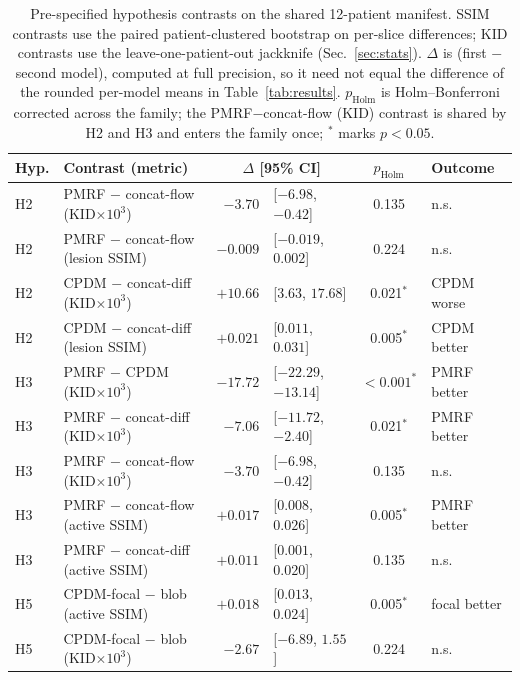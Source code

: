 \documentclass[11pt,a4paper]{article}
\newcommand{\num}[1]{#1}
\begin{document}
\begin{table}[h]\centering\footnotesize
\setlength{\tabcolsep}{5pt}
\caption[Pre-specified hypothesis contrasts on the shared 12-patient manifest]{Pre-specified
hypothesis contrasts on the shared \num{12}-patient manifest. SSIM contrasts use the paired
patient-clustered bootstrap on per-slice differences; KID contrasts use the leave-one-patient-out
jackknife (Sec.~\ref{sec:stats}). $\Delta$ is (first $-$ second model), computed at full
precision, so it need not equal the difference of the rounded per-model means in
Table~\ref{tab:results}. $p_{\text{Holm}}$ is Holm--Bonferroni corrected across the family; the
PMRF$-$concat-flow (KID) contrast is shared by H2 and H3 and enters the family once; $^*$ marks
$p<0.05$.}
\label{tab:hyptests}
\begin{tabular}{@{}l l r@{ }l c l@{}}
\toprule
Hyp. & Contrast (metric) & \multicolumn{2}{c}{$\Delta$ [95\% CI]} & $p_{\text{Holm}}$ & Outcome \\
\midrule
H2 & PMRF $-$ concat-flow (KID$\times10^3$)   & $-3.70$  & [$-6.98$, $-0.42$]    & \num{0.135}     & n.s. \\
H2 & PMRF $-$ concat-flow (lesion SSIM)       & $-0.009$ & [$-0.019$, $0.002$]   & \num{0.224}     & n.s. \\
H2 & CPDM $-$ concat-diff (KID$\times10^3$)   & $+10.66$ & [$3.63$, $17.68$]     & \num{0.021}$^*$ & CPDM worse \\
H2 & CPDM $-$ concat-diff (lesion SSIM)       & $+0.021$ & [$0.011$, $0.031$]    & \num{0.005}$^*$ & CPDM better \\
\addlinespace
H3 & PMRF $-$ CPDM (KID$\times10^3$)          & $-17.72$ & [$-22.29$, $-13.14$]  & $<0.001^*$      & PMRF better \\
H3 & PMRF $-$ concat-diff (KID$\times10^3$)   & $-7.06$  & [$-11.72$, $-2.40$]   & \num{0.021}$^*$ & PMRF better \\
H3 & PMRF $-$ concat-flow (KID$\times10^3$)   & $-3.70$  & [$-6.98$, $-0.42$]    & \num{0.135}     & n.s. \\
H3 & PMRF $-$ concat-flow (active SSIM)       & $+0.017$ & [$0.008$, $0.026$]    & \num{0.005}$^*$ & PMRF better \\
H3 & PMRF $-$ concat-diff (active SSIM)       & $+0.011$ & [$0.001$, $0.020$]    & \num{0.135}     & n.s. \\
\addlinespace
H5 & CPDM-focal $-$ blob (active SSIM)        & $+0.018$ & [$0.013$, $0.024$]    & \num{0.005}$^*$ & focal better \\
H5 & CPDM-focal $-$ blob (KID$\times10^3$)    & $-2.67$  & [$-6.89$, $1.55$]     & \num{0.224}     & n.s. \\
\bottomrule
\end{tabular}
\end{table}
\end{document}
